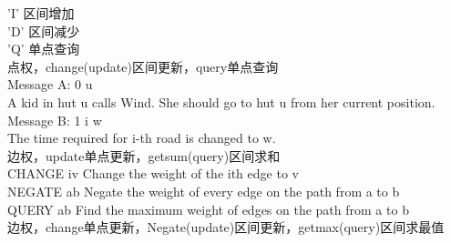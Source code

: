 'I' 区间增加 \\
'D' 区间减少 \\
'Q' 单点查询 \\
点权，change(update)区间更新，query单点查询 \\


Message A: 0 u \\
A kid in hut u calls Wind. She should go to hut u from her current position. \\
Message B: 1 i w \\
The time required for i-th road is changed to w. \\
边权，update单点更新，getsum(query)区间求和 \\


CHANGE iv Change the weight of the ith edge to v \\
NEGATE ab Negate the weight of every edge on the path from a to b \\
QUERY  ab Find the maximum weight of edges on the path from a to b \\
边权，change单点更新，Negate(update)区间更新，getmax(query)区间求最值 \\

